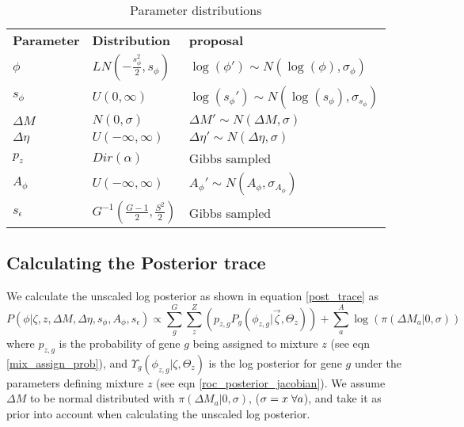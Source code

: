 \documentclass[11pt]{article}
\begin{document}
  
  \begin{table}[h]
    \centering
    \caption{Parameter distributions}
    \label{param_dist}
    \begin{tabular}{|l|l|l|}
      \cline{1-3}
      \textbf{Parameter} & \textbf{Distribution}				& \textbf{proposal}					\\ \cline{1-3}
      $\phi$		& $LN(-\frac{s_{\phi}^2}{2}, s_{\phi})$	& $\log(\phi') \sim N(\log(\phi), \sigma_{\phi})$		\\ \cline{1-3}
      $s_{\phi}$	& $U(0, \infty)$	& $\log(s_\phi') \sim N(\log(s_\phi), \sigma_{s_{\phi}})$		\\ \cline{1-3}
      $\Delta M$	& $N(0, \sigma)$	& $\Delta M' \sim N(\Delta M, \sigma)$		\\ \cline{1-3}
      $\Delta \eta$	& $U(-\infty, \infty)$	& $\Delta \eta' \sim N(\Delta \eta, \sigma)$		\\ \cline{1-3}
      $p_z$		& $Dir(\alpha)$		& Gibbs sampled	\\ \cline{1-3}
      $A_{\phi}$	& $U(-\infty, \infty)$	& $A_\phi' \sim N(A_\phi, \sigma_{A_{\phi}})$		\\ \cline{1-3}
      $s_{\epsilon}$	& $G^{-1}(\frac{G-1}{2}, \frac{S^2}{2})$	& Gibbs sampled	\\ \cline{1-3}
    \end{tabular}
  \end{table}
  
  \subsection{Calculating the Posterior trace}
  We calculate the unscaled log posterior as shown in equation \ref{post_trace} as
  \begin{equation}
    P(\phi | \zeta, z, \Delta M, \Delta \eta, s_{\phi}, A_{\phi}, s_{\epsilon}) \propto \sum_g^G \sum_z^Z \left(p_{z,g}P_g(\phi_{z,g}|\vec{\zeta}, \Theta_z)\right) + \sum_a^A \log(\pi(\Delta M_a| 0, \sigma))
    \label{post_trace}
  \end{equation}
  where $p_{z,g}$ is the probability of gene $g$ being assigned to mixture $z$ (see eqn \ref{mix_assign_prob}), 
  and $\Upsilon_g(\phi_{z,g}|\zeta, \Theta_z)$ is the log posterior for gene $g$ under the parameters defining mixture $z$ (see eqn \ref{roc_posterior_jacobian}). We assume $\Delta M$ to be normal distributed with $\pi(\Delta M_a| 0, \sigma)$, 
  ($\sigma = x \hspace{1mm} \forall a$), and take it as prior into account when calculating the unscaled log posterior. 
  
\end{document}
